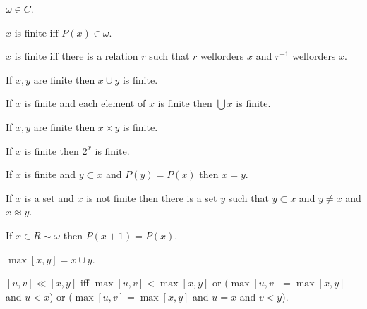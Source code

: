 \documentclass[a4paper,draft]{amsproc}
\begin{document}
\begin{forthel}
\begin{theorem}[165]
$\omega \in C$.
\end{theorem}

\begin{definition}[166]
$x$ is finite iff $P(x) \in \omega$.
\end{definition}

\begin{theorem}[167]
$x$ is finite iff there is a relation $r$ such that $r$ wellorders $x$ and $r^{-1}$ wellorders $x$.
\end{theorem}

\begin{theorem}[168]
If $x, y$ are finite then $x \cup y$ is finite.
\end{theorem}

\begin{theorem}[169]
If $x$ is finite and each element of $x$ is finite then $\bigcup x$ is finite.
\end{theorem}

\begin{theorem}[170]
If $x, y$ are finite then $x \times y$ is finite.
\end{theorem}

\begin{theorem}[171]
If $x$ is finite then $2^{x}$ is finite.
\end{theorem}

\begin{theorem}[172]
If $x$ is finite and $y \subset x$ and $P(y) = P(x)$ then $x = y$.
\end{theorem}

\begin{theorem}[173]
If $x$ is a set and $x$ is not finite then there is a set $y$ such that $y \subset x$ and $y \neq x$ and $x \approx y$.
\end{theorem}

\begin{theorem}[174]
If $x \in R \sim \omega$ then $P(x + 1) = P(x)$.
\end{theorem}

\begin{definition}[175]
$\max[x,y] = x \cup y$.
\end{definition}

\begin{definition}
$[u,v] \ll [x,y]$ iff $\max[u,v] < \max[x,y]$ or ($\max[u,v] = \max[x,y]$ and $u < x$)
or ($\max[u,v] = \max[x,y]$ and $u = x$ and $v < y$).
\end{definition}


\end{forthel}
\end{document}
